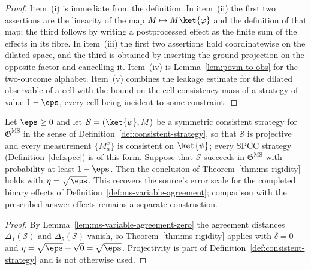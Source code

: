 \begin{proof}
	\leanok
	Item~(i) is immediate from the definition. In item~(ii) the first two assertions are the linearity of the map $M \mapsto M\ket{\varphi}$ and the definition of that map; the third follows by writing a postprocessed effect as the finite sum of the effects in its fibre. In item~(iii) the first two assertions hold coordinatewise on the dilated space, and the third is obtained by inserting the ground projection on the opposite factor and cancelling it. Item~(iv) is Lemma~\ref{lem:povm-to-obs} for the two-outcome alphabet. Item~(v) combines the leakage estimate for the dilated observable of a cell with the bound on the cell-consistency mass of a strategy of value $1-\eps$, every cell being incident to some constraint.
\end{proof}

\begin{corollary}\label{cor:ms-rigidity-symmetric-consistent}
	\leanok
	Let $\eps \ge 0$ and let $\mathcal S = (\ket{\psi}, M)$ be a symmetric consistent strategy for $\mathfrak{G}^{\mathrm{MS}}$ in the sense of Definition~\ref{def:consistent-strategy}, so that $\mathcal S$ is projective and every measurement $\{M^x_a\}$ is consistent on $\ket{\psi}$; every SPCC strategy (Definition~\ref{def:spcc}) is of this form. Suppose that $\mathcal S$ succeeds in $\mathfrak{G}^{\mathrm{MS}}$ with probability at least $1-\eps$. Then the conclusion of Theorem~\ref{thm:ms-rigidity} holds with $\eta = \sqrt\eps$.
	This recovers the source's error scale for the completed binary effects of
	Definition~\ref{def:ms-variable-agreement}; comparison with the
	prescribed-answer effects remains a separate construction.
\end{corollary}
\begin{proof}
	\leanok
	By Lemma~\ref{lem:ms-variable-agreement-zero} the agreement distances $\Delta_1(\mathcal S)$ and $\Delta_5(\mathcal S)$ vanish, so Theorem~\ref{thm:ms-rigidity} applies with $\delta = 0$ and $\eta = \sqrt\eps + \sqrt{0} = \sqrt\eps$. Projectivity is part of Definition~\ref{def:consistent-strategy} and is not otherwise used.
\end{proof}

